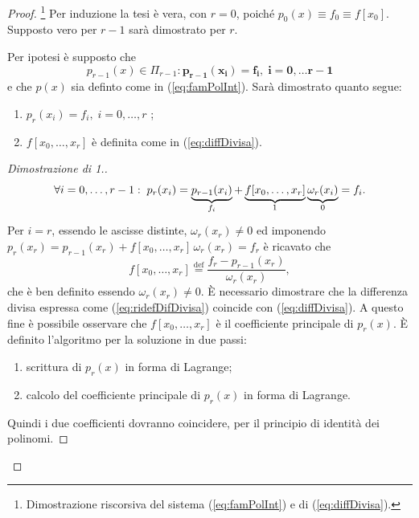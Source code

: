 \begin{proof}\footnote{Dimostrazione riscorsiva del sistema (\ref{eq:famPolInt}) e di (\ref{eq:diffDivisa}).}
    Per induzione la tesi è vera, con $r=0$, poiché $p_0(x)\equiv f_0\equiv f[x_0]$. Supposto vero per $r-1$ sarà dimostrato per $r$.
    
    Per ipotesi è supposto che
    \begin{equation*}
        p_{r-1}(x)\in\Pi_{r-1}:\boldsymbol{p_{r-1}(x_i)=f_i,\; i=0,\hdots r-1}
    \end{equation*}
    e che $p(x)$ sia definto come in (\ref{eq:famPolInt}). Sarà dimostrato quanto segue:
    \begin{enumerate}
        \item $p_r(x_i)=f_i, \; i=0,\hdots,r$ \footnotemark;
        \item $f[x_0, \hdots, x_r]$ è definita come in (\ref{eq:diffDivisa}).
    \end{enumerate}
    \begin{proof}[Dimostrazione di 1.]
        \begin{equation*}
        \forall i=0,\hdots, r-1:\; p_r(x_i)=\underbrace{p_{r-1}(x_i)}_{f_i}+\underbrace{f[x_0, \hdots, x_r]}_{\footnotemark}\underbrace{\omega_r(x_i)}_{0}=f_i.
        \end{equation*}
        Per $i=r$, essendo le ascisse distinte, $\omega_r(x_r)\neq 0$ ed imponendo $p_r(x_r)=p_{r-1}(x_r)+f[x_0,\hdots,x_r]\,\omega_r(x_r)=f_r$ è ricavato che
        \begin{equation}\label{eq:ridefDifDivisa}
            f[x_0, \hdots, x_r]\overset{\text{def}}{=}\frac{f_r-p_{r-1}(x_r)}{\omega_r(x_r)},
        \end{equation}
        che è ben definito essendo  $\omega_r(x_r)\neq 0$.
        È necessario dimostrare che la differenza divisa espressa come (\ref{eq:ridefDifDivisa}) coincide con (\ref{eq:diffDivisa}). A questo fine è possibile osservare che $f[x_0, \hdots, x_r]$ è il coefficiente principale di $p_r(x)$.
        È definito l'algoritmo per la soluzione in due passi: 
        \begin{enumerate}
            \item scrittura di $p_r(x)$ in forma di Lagrange;
            \item calcolo del coefficiente principale di $p_r(x)$ in forma di Lagrange.
        \end{enumerate}
        Quindi i due coefficienti dovranno coincidere, per il principio di identità dei polinomi.
    

\end{proof}
\end{proof}

